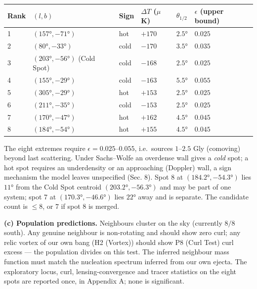 \documentclass[
]{article}
\begin{document}
\begin{longtable}[]{@{}llllll@{}}
\toprule
Rank & \((l, b)\) & Sign & \(\Delta T\) (\(\mu\)K) & \(\theta_{1/2}\) &
\(\epsilon\) (upper bound)\tabularnewline
\midrule
\endhead
1 & \((157°, -71°)\) & hot & \(+170\) & \(2.5°\) &
\(0.025\)\tabularnewline
2 & \((80°, -33°)\) & cold & \(-170\) & \(3.5°\) &
\(0.035\)\tabularnewline
3 & \((203°, -56°)\) (Cold Spot) & cold & \(-168\) & \(2.5°\) &
\(0.025\)\tabularnewline
4 & \((155°, -29°)\) & cold & \(-163\) & \(5.5°\) &
\(0.055\)\tabularnewline
5 & \((305°, -29°)\) & hot & \(+153\) & \(2.5°\) &
\(0.025\)\tabularnewline
6 & \((211°, -35°)\) & cold & \(-153\) & \(2.5°\) &
\(0.025\)\tabularnewline
7 & \((170°, -47°)\) & hot & \(+162\) & \(4.5°\) &
\(0.045\)\tabularnewline
8 & \((184°, -54°)\) & hot & \(+155\) & \(4.5°\) &
\(0.045\)\tabularnewline
\bottomrule
\end{longtable}

The eight extremes require \(\epsilon = 0.025\)--\(0.055\), i.e.~sources
\(1\)--\(2.5\) Gly (comoving) beyond last scattering. Under Sachs--Wolfe
an overdense wall gives a \emph{cold} spot; a hot spot requires an
underdensity or an approaching (Doppler) wall, a sign mechanism the
model leaves unspecified (Sec. 8). Spot 8 at \((184.2°, -54.3°)\) lies
\(11°\) from the Cold Spot centroid \((203.2°, -56.3°)\) and may be part
of one system; spot 7 at \((170.3°, -46.6°)\) lies \(22°\) away and is
separate. The candidate count is \(\leq 8\), or \(7\) if spot 8 is
merged.

\textbf{(c) Population predictions.} Neighbours cluster on the sky
(currently \(8/8\) south). Any genuine neighbour is non-rotating and
should show zero curl; any relic vortex of our own bang (H2 (Vortex))
should show P8 (Curl Test) curl excess --- the population divides on
this test. The inferred neighbour mass function must match the
nucleation spectrum inferred from our own ejecta. The exploratory locus,
curl, lensing-convergence and tracer statistics on the eight spots are
reported once, in Appendix A; none is significant.
\end{document}
